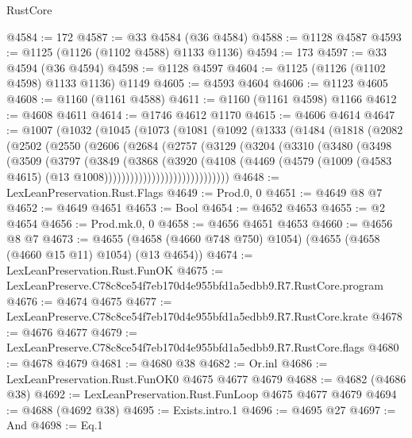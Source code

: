 \begin{lexlean}{RustCore}
\begin{coremodule}
@4584 := 172
@4587 := @33 @4584 (@36 @4584)
@4588 := @1128 @4587
@4593 := @1125 (@1126 (@1102 @4588) @1133 @1136)
@4594 := 173
@4597 := @33 @4594 (@36 @4594)
@4598 := @1128 @4597
@4604 := @1125 (@1126 (@1102 @4598) @1133 @1136) @1149
@4605 := @4593 @4604
@4606 := @1123 @4605
@4608 := @1160 (@1161 @4588)
@4611 := @1160 (@1161 @4598) @1166
@4612 := @4608 @4611
@4614 := @1746 @4612 @1170
@4615 := @4606 @4614
@4647 := @1007
    (@1032
      (@1045
        (@1073
          (@1081
            (@1092
              (@1333
                (@1484
                  (@1818
                    (@2082
                      (@2502
                        (@2550
                          (@2606
                            (@2684
                              (@2757
                                (@3129
                                  (@3204
                                    (@3310
                                      (@3480
                                        (@3498
                                          (@3509
                                            (@3797
                                              (@3849
                                                (@3868
                                                  (@3920
                                                    (@4108
                                                      (@4469
                                                        (@4579
                                                          (@1009
                                                            (@4583 @4615)
                                                            (@13 @1008)))))))))))))))))))))))))))))
@4648 := LexLeanPreservation.Rust.Flags
@4649 := Prod.{0, 0}
@4651 := @4649 @8 @7
@4652 := @4649 @4651
@4653 := Bool
@4654 := @4652 @4653
@4655 := @2 @4654
@4656 := Prod.mk.{0, 0}
@4658 := @4656 @4651 @4653
@4660 := @4656 @8 @7
@4673 := @4655 (@4658 (@4660 @748 @750) @1054) (@4655 (@4658 (@4660 @15 @11) @1054) (@13 @4654))
@4674 := LexLeanPreservation.Rust.FunOK
@4675 := LexLeanPreserve.C78c8ce54f7eb170d4e955bfd1a5edbb9.R7.RustCore.program
@4676 := @4674 @4675
@4677 := LexLeanPreserve.C78c8ce54f7eb170d4e955bfd1a5edbb9.R7.RustCore.krate
@4678 := @4676 @4677
@4679 := LexLeanPreserve.C78c8ce54f7eb170d4e955bfd1a5edbb9.R7.RustCore.flags
@4680 := @4678 @4679
@4681 := @4680 @38
@4682 := Or.inl
@4686 := LexLeanPreservation.Rust.FunOK0 @4675 @4677 @4679
@4688 := @4682 (@4686 @38)
@4692 := LexLeanPreservation.Rust.FunLoop @4675 @4677 @4679
@4694 := @4688 (@4692 @38)
@4695 := Exists.intro.{1}
@4696 := @4695 @27
@4697 := And
@4698 := Eq.{1}

\end{coremodule}
\end{lexlean}
